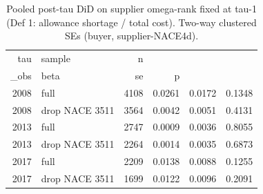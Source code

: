 \begin{table}[ht]
\centering
\caption{Pooled post-tau DiD on supplier omega-rank fixed at tau-1 (Def 1: allowance shortage / total cost). Two-way clustered SEs (buyer, supplier-NACE4d).} 
\begin{tabular}{rlrrrr}
  \toprule
tau & sample & n\\_obs & beta & se & p \\ 
  \midrule
 2008 & full &  4108 & 0.0261 & 0.0172 & 0.1348 \\ 
   2008 & drop NACE 3511 &  3564 & 0.0042 & 0.0051 & 0.4131 \\ 
   2013 & full &  2747 & 0.0009 & 0.0036 & 0.8055 \\ 
   2013 & drop NACE 3511 &  2264 & 0.0014 & 0.0035 & 0.6873 \\ 
   2017 & full &  2209 & 0.0138 & 0.0088 & 0.1255 \\ 
   2017 & drop NACE 3511 &  1699 & 0.0122 & 0.0096 & 0.2091 \\ 
   \bottomrule
\end{tabular}
\end{table}
